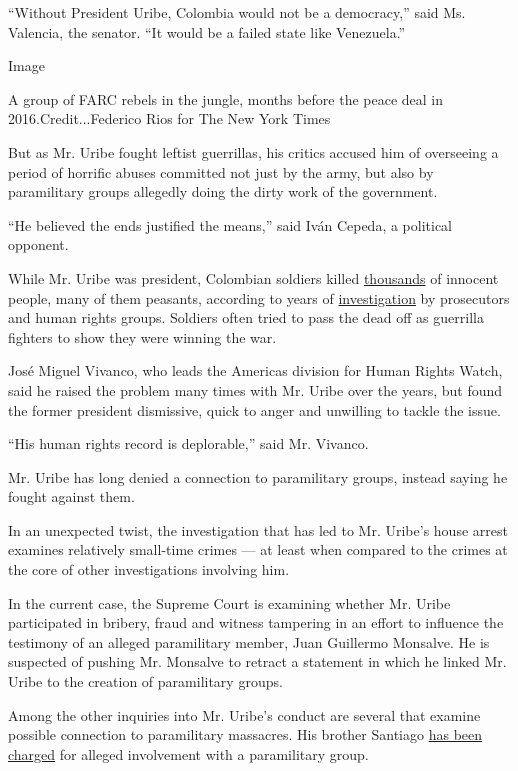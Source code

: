 ``Without President Uribe, Colombia would not be a democracy,'' said Ms.
Valencia, the senator. ``It would be a failed state like Venezuela.''

Image

A group of FARC rebels in the jungle, months before the peace deal in
2016.Credit...Federico Rios for The New York Times

But as Mr. Uribe fought leftist guerrillas, his critics accused him of
overseeing a period of horrific abuses committed not just by the army,
but also by paramilitary groups allegedly doing the dirty work of the
government.

``He believed the ends justified the means,'' said Iván Cepeda, a
political opponent.

While Mr. Uribe was president, Colombian soldiers killed
\href{https://www2.ohchr.org/english/bodies/hrcouncil/docs/14session/A.HRC.14.24.Add.2_en.pdf}{thousands}
of innocent people, many of them peasants, according to years of
\href{https://www.hrw.org/report/2015/06/24/their-watch/evidence-senior-army-officers-responsibility-false-positive-killings}{investigation}
by prosecutors and human rights groups. Soldiers often tried to pass the
dead off as guerrilla fighters to show they were winning the war.

José Miguel Vivanco, who leads the Americas division for Human Rights
Watch, said he raised the problem many times with Mr. Uribe over the
years, but found the former president dismissive, quick to anger and
unwilling to tackle the issue.

``His human rights record is deplorable,'' said Mr. Vivanco.

Mr. Uribe has long denied a connection to paramilitary groups, instead
saying he fought against them.

In an unexpected twist, the investigation that has led to Mr. Uribe's
house arrest examines relatively small-time crimes --- at least when
compared to the crimes at the core of other investigations involving
him.

In the current case, the Supreme Court is examining whether Mr. Uribe
participated in bribery, fraud and witness tampering in an effort to
influence the testimony of an alleged paramilitary member, Juan
Guillermo Monsalve. He is suspected of pushing Mr. Monsalve to retract a
statement in which he linked Mr. Uribe to the creation of paramilitary
groups.

Among the other inquiries into Mr. Uribe's conduct are several that
examine possible connection to paramilitary massacres. His brother
Santiago
\href{https://www.nytimes.com/2018/07/08/world/americas/colombia-uribe-death-squad.html}{has
been charged} for alleged involvement with a paramilitary group.

